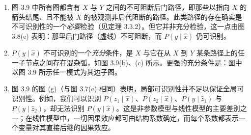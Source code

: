 \begin{enumerate}[label=\arabic*.,leftmargin=1.8em]
\item 图 3.9 中所有图都含有 $X$ 与 $Y$ 之间的不可阻断后门路径，即那些以指向 $X$ 的箭头结尾、且不能被 $X$ 的被观测非后代阻断的路径。此类路径的存在确实是不可识别性的一个\emph{必要}检验（见定理 3.3.2）。但它并非充分检验，这一点由图 3.8(e) 表明：那里后门路径（虚线）不可阻断，而 $P(y\mid\hat{x})$ 仍可识别。
\item $P(y\mid\hat{x})$ 不可识别的一个\emph{充分}条件，是 $X$ 与它在从 $X$ 到 $Y$ 某条路径上的任一子节点之间存在混杂弧，如图 3.9(b)、(c) 所示。更强的充分条件是：图中以图 3.9 所示任一模式为其边子图。
\item 图 3.9 的图 (g)（与图 3.7(c) 相同）表明，局部可识别性并不足以保证全局可识别性。例如，我们可以识别 $P(z_1\mid\hat{x})$、$P(z_2\mid\hat{x})$、$P(y\mid\hat{z}_1)$ 与 $P(y\mid\hat{z}_2)$，却无法识别 $P(y\mid\hat{x})$。这是非参数模型与线性模型的主要差别之一；在线性模型中，一切因果效应都可由结构系数确定，而每个系数都表示一个变量对其直接后继的因果效应。
\end{enumerate}
